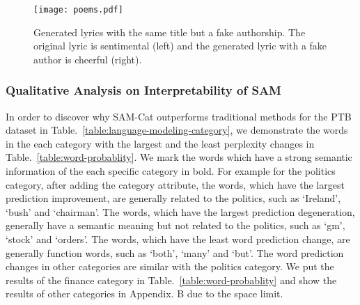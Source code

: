 \documentclass[a4paper]{article}
\newcommand{\method}{\xspace{SAM}}
\begin{document}
\begin{figure*}[t]\centering
\begin{center}
    {
    \vspace{-0.2cm}
    \texttt{[image: poems.pdf]}
    \vspace{-0.2cm}
    }
    \caption{Generated lyrics with the same title but a fake authorship. The original lyric is sentimental (left) and the generated lyric with a fake author is cheerful (right).}
    \vspace{-0.3cm}
    \label{fig:lyric_cn}
\end{center}
\vspace{-0.1cm}
\end{figure*}
\subsubsection{Qualitative Analysis on Interpretability of \method}
In order to discover why SAM-Cat outperforms traditional methods for the PTB dataset in Table.~\ref{table:language-modeling-category}, we demonstrate the words in the each category with the largest and the least perplexity changes in Table.~\ref{table:word-probablity}. We mark the words which have a strong semantic information of the each specific category in bold. For example for the politics category, after adding the category attribute, the words, which have the largest prediction improvement, are generally related to the politics, such as `Ireland', `bush' and `chairman'. The words, which have the largest prediction degeneration, generally have a semantic meaning but not related to the politics, such as `gm', `stock' and `orders'. The words, which have the least word prediction change, are generally function words, such as `both', `many' and `but'. The word prediction changes in other categories are similar with the politics category. We put the results of the finance category in Table.~\ref{table:word-probablity} and show the results of other categories in Appendix. B due to the space limit.


\end{document}
